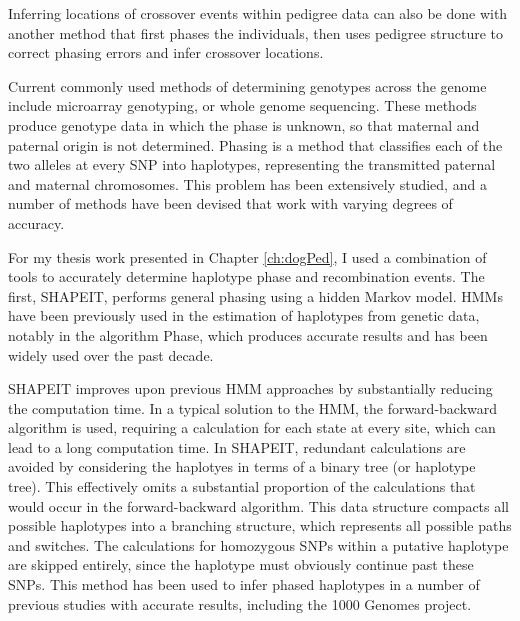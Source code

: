 Inferring locations of crossover events within pedigree data can also be done with another method that first phases the individuals, then uses pedigree structure to correct phasing errors and infer crossover locations.

Current commonly used methods of determining genotypes across the genome include microarray genotyping, or whole genome sequencing.
These methods produce genotype data in which the phase is unknown, so that maternal and paternal origin is not determined.
Phasing is a method that classifies each of the two alleles at every SNP into haplotypes, representing the transmitted paternal and maternal chromosomes.
This problem has been extensively studied, and a number of methods have been devised that work with varying degrees of accuracy.

For my thesis work presented in Chapter \ref{ch:dogPed}, I used a combination of tools to accurately determine haplotype phase and recombination events.
The first, SHAPEIT\cite{Delaneau2013}, performs general phasing using a hidden Markov model.
HMMs have been previously used in the estimation of haplotypes from genetic data, notably in the algorithm Phase\cite{Stephens2001}, which produces accurate results and has been widely used over the past decade.

SHAPEIT improves upon previous HMM approaches by substantially reducing the computation time.
In a typical solution to the HMM, the forward-backward algorithm is used, requiring a calculation for each state at every site, which can lead to a long computation time.
In SHAPEIT, redundant calculations are avoided by considering the haplotyes in terms of a binary tree (or haplotype tree)\cite{Delaneau2013}.
This effectively omits a substantial proportion of the calculations that would occur in the forward-backward algorithm.
This data structure compacts all possible haplotypes into a branching structure, which represents all possible paths and switches.
The calculations for homozygous SNPs within a putative haplotype are skipped entirely, since the haplotype must obviously continue past these SNPs.
This method has been used to infer phased haplotypes in a number of previous studies with accurate results, including the 1000 Genomes project\cite{1000G2015}.

